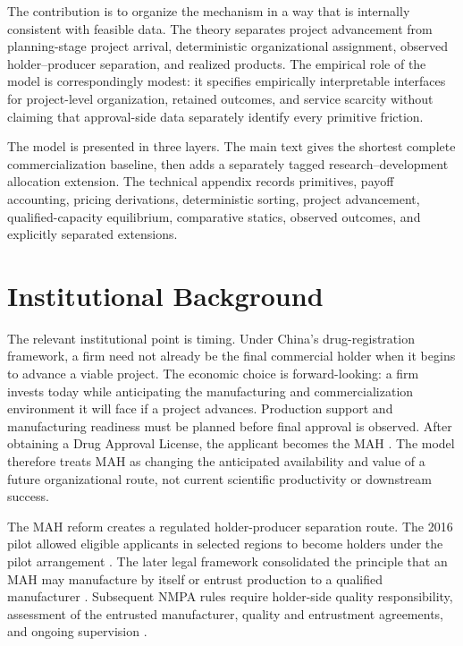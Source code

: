 \documentclass[12pt]{article}
\newcommand{\1}{\mathbf{1}}
\begin{document}
The contribution is to organize the mechanism in a way that is internally
consistent with feasible data. The theory separates project advancement from
planning-stage project arrival, deterministic organizational assignment,
observed holder--producer separation, and realized products. The empirical
role of the model is correspondingly modest: it specifies empirically interpretable
interfaces for project-level organization, retained outcomes, and service
scarcity without claiming that approval-side data separately identify every
primitive friction.

The model is presented in three layers. The main text gives the shortest
complete commercialization baseline, then adds a separately tagged
research--development allocation extension. The technical appendix
records primitives, payoff accounting, pricing derivations, deterministic
sorting, project advancement, qualified-capacity equilibrium, comparative
statics, observed outcomes, and explicitly separated extensions.

\section{Institutional Background}

The relevant institutional point is timing. Under China's drug-registration
framework, a firm need not already be the final commercial holder when it
begins to advance a viable project. The economic choice is forward-looking: a
firm invests today while anticipating the manufacturing and commercialization
environment it will face if a project advances. Production support and
manufacturing readiness must be planned before final approval is observed.
After obtaining a Drug Approval License, the applicant becomes the MAH
\citep{NMPARegistration2022}. The model therefore treats MAH as changing the
anticipated availability and value of a future organizational route, not
current scientific productivity or downstream success.

The MAH reform creates a regulated holder-producer separation route. The 2016
pilot allowed eligible applicants in selected regions to become holders under
the pilot arrangement
\citep{StateCouncilMAHPilot2016,CFDAMAHImplementation2016}. The later legal
framework consolidated the principle that an MAH may manufacture by itself or
entrust production to a qualified manufacturer
\citep{DrugAdministrationLaw2019}. Subsequent NMPA rules require holder-side
quality responsibility, assessment of the entrusted manufacturer, quality and
entrustment agreements, and ongoing supervision
\citep{NMPAHolderResponsibility2022,NMPAManufacturing2022,NMPAEntrustedProduction2023}.
\end{document}

